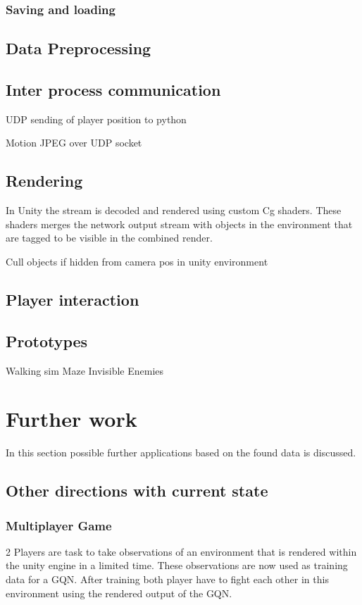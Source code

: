 \documentclass[a4paper, twoside, 10pt]{report}
\begin{document}
\subsection{Saving and loading}
\section{Data Preprocessing}
\section{Inter process communication}
UDP sending of player position to python

Motion JPEG over UDP socket 

\section{Rendering}
In Unity the stream is decoded and rendered using custom Cg shaders. These shaders merges the network output stream with objects in the environment that are tagged to be visible in the combined render.

Cull objects if hidden from camera pos in unity environment

\section{Player interaction}
\section{Prototypes}
Walking sim
Maze
Invisible Enemies

\chapter{Further work}
In this section possible further applications based on the found data is discussed.

\section{Other directions with current state}
\subsection{Multiplayer Game}
2 Players are task to take observations of an environment that is rendered within the unity engine in a limited time. These observations  are now used as training data for a GQN. After training both player have to fight each other in this environment using the rendered output of the GQN.
\end{document}
